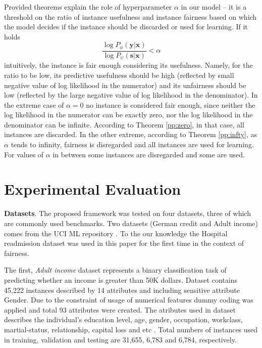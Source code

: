 \documentclass[preprint,12pt]{elsarticle}
\begin{document}
Provided theorems explain the role of hyperparameter $\alpha$ in our model -- it is a threshold on the ratio of instance usefulness and instance fairness based on which the model decides if the instance should be discarded or used for learning.
If it holds
$$\frac{\log P_{\phi}(\mathbf{y}|\mathbf{x})}{\log P_{\psi}(\mathbf{s}|\mathbf{x})}<\alpha$$
intuitively, the instance is fair enough considering its usefulness. Namely, for the ratio to be low, its predictive usefulness should be high (reflected by small negative value of log likelihood in the numerator) and its unfairness should be low (reflected by the large negative value of log likelihood in the denominator). In the extreme case of $\alpha=0$ no instance is considered fair enough, since neither the log likelihood in the numerator can be exactly zero, nor the log likelihood in the denominator can be infinite. According to Theorem \ref{pp:zero}, in that case, all instances are discarded. In the other extreme, according to Theorem \ref{pp:infty}, as $\alpha$ tends to infinity,  fairness is disregarded and all instances are used for learning. For values of $\alpha$ in between some instances are disregarded and some are used.


\section{Experimental Evaluation}
\label{Sec:exp-evaluation}

\textbf{Datasets}. The proposed framework was tested on four datasets, three of which are commonly used benchmarks. Two datasets (German credit and Adult income) comes from the UCI ML repository \cite{frank2011uci}. To the our knowledge the Hospital readmission dataset was used in this paper for the first time in the context of fairness. 

The first, \textit{Adult income} dataset \cite{kohavi1996scaling} represents a binary classification task of predicting whether an income is greater than 50K dollars. Dataset contains 45,222 instances described by 14 attributes and including sensitive attribute Gender. Due to the constraint of usage of numerical features dummy coding was applied and total 93 attributes were created. The atributes used in dataset describes the individual's education level, age, gender, occupation, workclass, martial-status, relationship, capital loss and etc \cite{Dua:2019}. Total numbers of instances used in training, validation and testing are 31,655, 6,783 and 6,784, respectively. 
\end{document}

